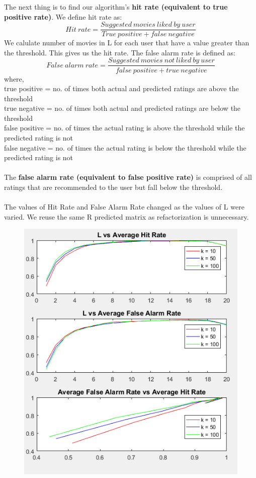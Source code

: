 \documentclass[12pt, onecolumn]{IEEEtran}
\begin{document}
The next thing is to find our algorithm's \textbf{hit rate (equivalent to true positive rate)}. We define hit rate as: 
\begin{equation}
	Hit\ rate = \frac{Suggested\ movies\ liked\ by\ user}{True\ positive + false\ negative }
\end{equation}
We calulate number of movies in L for each user that have a value greater than the threshold. This gives us the hit rate. The false alarm rate is defined as:
\begin{equation}
	False\ alarm\ rate = \frac{Suggested\ movies\ not\ liked\ by\ user}{false\ positive + true\ negative}
\end{equation}
where,\\
true positive = no. of times both actual and predicted ratings are above the threshold\\
true negative = no. of times both actual and predicted ratings are below the threshold\\
false positive = no. of times the actual rating is above the threshold while the predicted rating is not\\
false negative = no. of times the actual rating is below the threshold while the predicted rating is not\\
\\The \textbf{false alarm rate (equivalent to false positive rate)} is comprised of all ratings that are recommended to the user but fall below the threshold.
\\\\	The values of Hit Rate and False Alarm Rate changed as the values of L were varied. We reuse the same R predicted matrix as refactorization is unnecessary.
\begin{figure}[h!]
\centering
\captionsetup{justification=centering}
\includegraphics[scale=0.85]{Graphs/5}
\end{figure}
\end{document}
